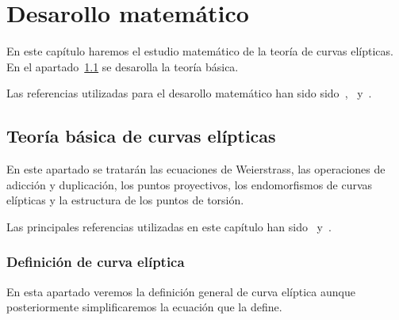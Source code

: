 \chapter{Desarollo matemático}
\label{ch:Desarollo matemático}



En este capítulo haremos el estudio matemático de la teoría de curvas elípticas. En el apartado~\ref{sec:Teoría básica de curvas elípticas} se desarolla la teoría básica.

Las referencias utilizadas para el desarollo matemático han sido sido~\cite{Washington:2008},~\cite{Hankerson:2003} y~\cite{Silverman:2009}.

\section{Teoría básica de curvas elípticas}
\label{sec:Teoría básica de curvas elípticas}

En este apartado se tratarán las ecuaciones de Weierstrass, las operaciones de adicción y duplicación, los puntos proyectivos, los endomorfismos de curvas elípticas y la estructura de los puntos de torsión.

Las principales referencias utilizadas en este capítulo han sido~\cite[cap. 2]{Washington:2008} y~\cite[cap. 3]{Hankerson:2003}.

\subsection{Definición de curva elíptica}
\label{sub:Definición de curva elíptica}

En esta apartado veremos la definición general de curva elíptica aunque posteriormente simplificaremos la ecuación que la define.

